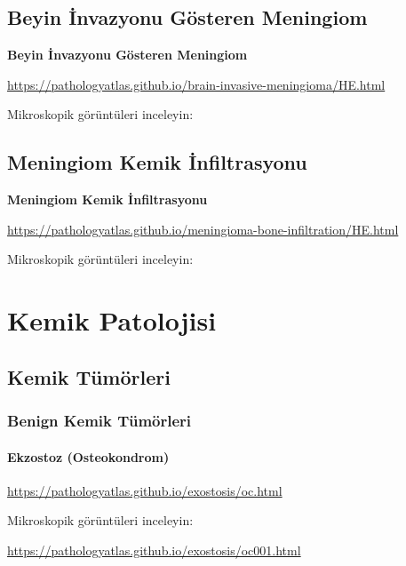 \documentclass[
  letterpaper,
  DIV=11,
  numbers=noendperiod]{scrreprt}
\begin{document}
\hypertarget{beyin-invazyonu-guxf6steren-meningiom}{%
\chapter{Beyin İnvazyonu Gösteren
Meningiom}\label{beyin-invazyonu-guxf6steren-meningiom}}

\textbf{Beyin İnvazyonu Gösteren Meningiom}

\url{https://pathologyatlas.github.io/brain-invasive-meningioma/HE.html}

Mikroskopik görüntüleri inceleyin:

\hypertarget{meningiom-kemik-infiltrasyonu}{%
\chapter{Meningiom Kemik
İnfiltrasyonu}\label{meningiom-kemik-infiltrasyonu}}

\textbf{Meningiom Kemik İnfiltrasyonu}

\url{https://pathologyatlas.github.io/meningioma-bone-infiltration/HE.html}

Mikroskopik görüntüleri inceleyin:

\part{Kemik Patolojisi}

\hypertarget{kemik-tuxfcmuxf6rleri}{%
\chapter{Kemik Tümörleri}\label{kemik-tuxfcmuxf6rleri}}

\hypertarget{benign-kemik-tuxfcmuxf6rleri}{%
\section{Benign Kemik Tümörleri}\label{benign-kemik-tuxfcmuxf6rleri}}

\hypertarget{ekzostoz-osteokondrom}{%
\subsection{Ekzostoz (Osteokondrom)}\label{ekzostoz-osteokondrom}}

\url{https://pathologyatlas.github.io/exostosis/oc.html}

Mikroskopik görüntüleri inceleyin:

\url{https://pathologyatlas.github.io/exostosis/oc001.html}
\end{document}
